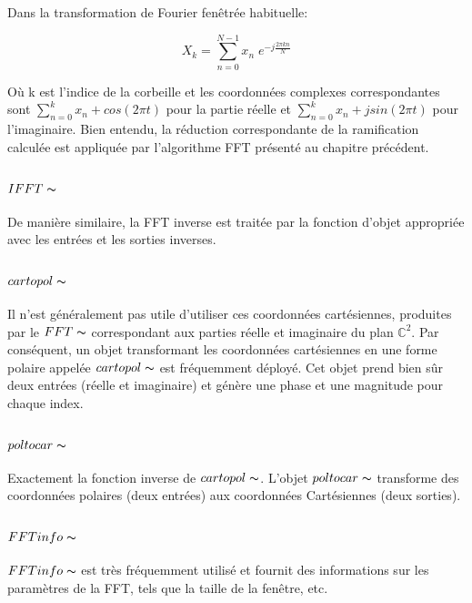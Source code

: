      Dans la transformation de Fourier fenêtrée habituelle:


    \begin{equation}
        X_k = \sum_{n=0}^{N-1} x_n \; e^{-j \frac{2 \pi k n}{N}}
    \end{equation}

    Où k est l’indice de la corbeille et les coordonnées complexes correspondantes sont $ \sum_{n = 0}^k x_n + cos (2 \pi t) $ pour la partie réelle et $ \sum_{n = 0}^k x_n + j sin (2 \pi t) $ pour l’imaginaire. Bien entendu, la réduction correspondante de la ramification calculée est appliquée par l’algorithme FFT présenté au chapitre précédent.


\subsubsection{$IFFT\thicksim$}
    
    De manière similaire, la FFT inverse est traitée par la fonction d'objet appropriée avec les entrées et les sorties inverses.

\subsubsection{$cartopol\thicksim$}
    
    Il n’est généralement pas utile d’utiliser ces coordonnées cartésiennes, produites par le $ FFT \thicksim $ correspondant aux parties réelle et imaginaire du plan $ \mathbb {C}^2 $. Par conséquent, un objet transformant les coordonnées cartésiennes en une forme polaire appelée $ cartopol \thicksim $ est fréquemment déployé. Cet objet prend bien sûr deux entrées (réelle et imaginaire) et génère une phase et une magnitude pour chaque index.

\subsubsection{$poltocar\thicksim$}
    
    Exactement la fonction inverse de $ cartopol \thicksim $. L’objet $ poltocar\thicksim $ transforme des coordonnées polaires (deux entrées) aux coordonnées Cartésiennes (deux sorties).

\subsubsection{$FFTinfo\thicksim$}
    
    $ FFTinfo \thicksim $ est très fréquemment utilisé et fournit des informations sur les paramètres de la FFT, tels que la taille de la fenêtre, etc.

